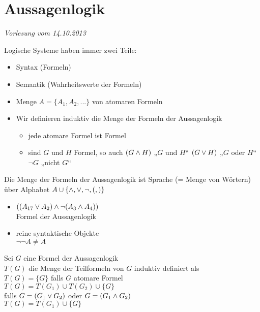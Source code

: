 
\section{Aussagenlogik}

\begin{flushright}
\textit{Vorlesung vom 14.10.2013}
\end{flushright}

Logische Systeme haben immer zwei Teile:
\begin{itemize}
\item Syntax (Formeln)
\item Semantik (Wahrheitswerte der Formeln)
\end{itemize}

\begin{itemize}
\item Menge $A = \{ A_1, A_2, ... \}$ von atomaren Formeln
\item Wir definieren induktiv die Menge der Formeln der Aussagenlogik
    \begin{itemize}
        \item jede atomare Formel ist Formel
        \item sind $G$ und $H$ Formel, so auch $( G \wedge H )$ „$G$ und $H$“ $(G \vee H)$ „$G$ oder $H$“ $\neg G$ „nicht $G$“
    \end{itemize}
\end{itemize}

\bemerkung{}
Die Menge der Formeln der Aussagenlogik ist Sprache (= Menge von Wörtern) über Alphabet $A \cup \{\wedge, \vee, \neg, (, ) \}$\\

\beispiel{}
\begin{itemize}
\item $ \left( ( A_{17} \vee A_2 ) \wedge \neg (A_3 \wedge A_4) \right)$\\
    Formel der Aussagenlogik
\item reine syntaktische Objekte\\
    $\neg \neg A \neq A$
\end{itemize}

\beweis{}
Sei $G$ eine Formel der Aussagenlogik\\
$T(G)$ die Menge der Teilformeln von $G$ induktiv definiert als\\
$T(G) = \{ G \}$ falls $G$ atomare Formel\\
$T(G) = T(G_1) \cup T(G_2) \cup \{G\}$\\
falls $G = (G_1 \vee G_2)$ oder $G=(G_1 \wedge G_2)$\\
$T(G)=T(G_1) \cup \{G\}$\\

